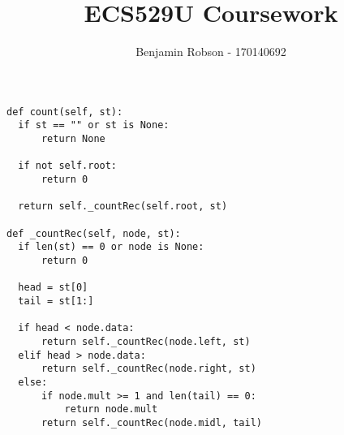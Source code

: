 \documentclass{article}
\title{ECS529U Coursework}
\author{Benjamin Robson - 170140692}
\date{}
\begin{document}
  \maketitle
  \newpage

  \begin{lstlisting}[frame=single, caption={Count function in word tree}, captionpos=b]
def count(self, st):
  if st == "" or st is None: 
      return None
  
  if not self.root:
      return 0

  return self._countRec(self.root, st)

def _countRec(self, node, st):
  if len(st) == 0 or node is None: 
      return 0
  
  head = st[0]
  tail = st[1:]
  
  if head < node.data: 
      return self._countRec(node.left, st)
  elif head > node.data: 
      return self._countRec(node.right, st)
  else:
      if node.mult >= 1 and len(tail) == 0:
          return node.mult
      return self._countRec(node.midl, tail)
  \end{lstlisting}
  \newpage
\end{document}
